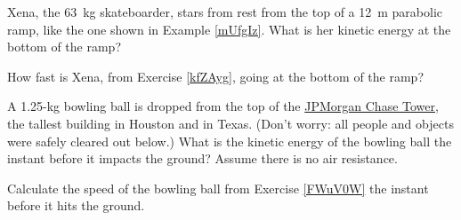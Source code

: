 \documentclass{article}
\numberwithin{equation}{section}
\numberwithin{figure}{section}
\begin{document}
\begin{exercise} \label{kfZAyg}
    Xena, the \SI{63}{kg} skateboarder, stars from rest from the top of a \SI{12}{m} parabolic ramp, like the one shown in Example \ref{mUfgIz}. What is her kinetic energy at the bottom of the ramp?
\end{exercise}

\begin{exercise} \label{5Nd1zt}
    How fast is Xena, from Exercise \ref{kfZAyg}, going at the bottom of the ramp?
\end{exercise}

\begin{exercise} \label{FWuV0W}
    A 1.25-kg bowling ball is dropped from the top of the \href{https://en.wikipedia.org/wiki/JPMorgan_Chase_Tower_(Houston)}{JPMorgan Chase Tower}, the tallest building in Houston and in Texas. (Don't worry: all people and objects were safely cleared out below.) What is the kinetic energy of the bowling ball the instant before it impacts the ground? Assume there is no air resistance.
\end{exercise}

\begin{exercise} \label{c4eP75}
    Calculate the speed of the bowling ball from Exercise \ref{FWuV0W} the instant before it hits the ground.
\end{exercise}







\clearpage





\end{document}
